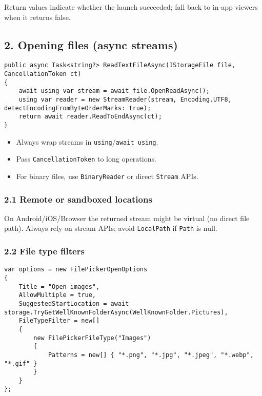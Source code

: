Return values indicate whether the launch succeeded; fall back to in-app
viewers when it returns false.

\subsection{2. Opening files (async
streams)}\label{opening-files-async-streams}

\begin{lstlisting}
public async Task<string?> ReadTextFileAsync(IStorageFile file, CancellationToken ct)
{
    await using var stream = await file.OpenReadAsync();
    using var reader = new StreamReader(stream, Encoding.UTF8, detectEncodingFromByteOrderMarks: true);
    return await reader.ReadToEndAsync(ct);
}
\end{lstlisting}

\begin{itemize}
\tightlist
\item
  Always wrap streams in
  \passthrough{\lstinline!using!}/\passthrough{\lstinline!await using!}.
\item
  Pass \passthrough{\lstinline!CancellationToken!} to long operations.
\item
  For binary files, use \passthrough{\lstinline!BinaryReader!} or direct
  \passthrough{\lstinline!Stream!} APIs.
\end{itemize}

\subsubsection{2.1 Remote or sandboxed
locations}\label{remote-or-sandboxed-locations}

On Android/iOS/Browser the returned stream might be virtual (no direct
file path). Always rely on stream APIs; avoid
\passthrough{\lstinline!LocalPath!} if \passthrough{\lstinline!Path!} is
null.

\subsubsection{2.2 File type filters}\label{file-type-filters}

\begin{lstlisting}
var options = new FilePickerOpenOptions
{
    Title = "Open images",
    AllowMultiple = true,
    SuggestedStartLocation = await storage.TryGetWellKnownFolderAsync(WellKnownFolder.Pictures),
    FileTypeFilter = new[]
    {
        new FilePickerFileType("Images")
        {
            Patterns = new[] { "*.png", "*.jpg", "*.jpeg", "*.webp", "*.gif" }
        }
    }
};
\end{lstlisting}

